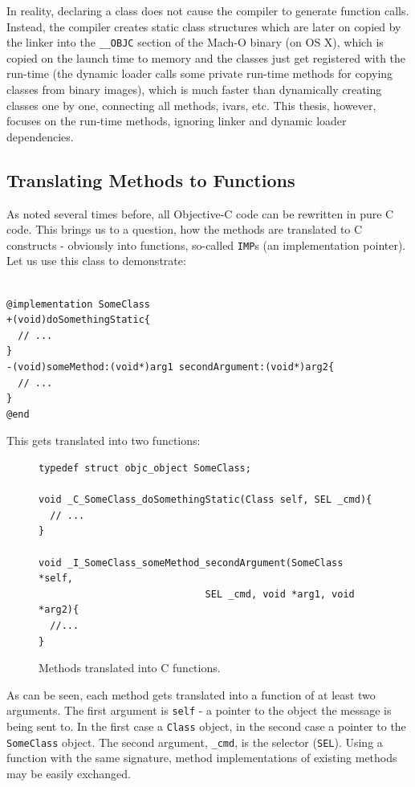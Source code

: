In reality, declaring a class does not cause the compiler to generate function calls. Instead, the compiler creates static class structures which are later on copied by the linker into the \verb=__OBJC= section of the Mach-O binary (on OS X), which is copied on the launch time to memory and the classes just get registered with the run-time (the dynamic loader calls some private run-time methods for copying classes from binary images), which is much faster than dynamically creating classes one by one, connecting all methods, ivars, etc. This thesis, however, focuses on the run-time methods, ignoring linker and dynamic loader dependencies.

\subsection{Translating Methods to Functions}

As noted several times before, all Objective-C code can be rewritten in pure C code. This brings us to a question, how the methods are translated to C constructs - obviously into functions, so-called \verb=IMP=s (an implementation pointer). Let us use this class to demonstrate:

\begin{verbatim}

@implementation SomeClass
+(void)doSomethingStatic{
  // ...
}
-(void)someMethod:(void*)arg1 secondArgument:(void*)arg2{
  // ...
}
@end

\end{verbatim}

This gets translated into two functions:

\begin{figure}[H]
\begin{verbatim}
typedef struct objc_object SomeClass;

void _C_SomeClass_doSomethingStatic(Class self, SEL _cmd){
  // ...
}

void _I_SomeClass_someMethod_secondArgument(SomeClass *self,
                             SEL _cmd, void *arg1, void *arg2){
  //...
}
\end{verbatim}
  \centering{}
  \caption{Methods translated into C functions.}
  \label{fig:methods_translated_into_C_fncts}
\end{figure}

As can be seen, each method gets translated into a function of at least two arguments. The first argument is \verb=self= - a pointer to the object the message is being sent to. In the first case a \verb=Class= object, in the second case a pointer to the \verb=SomeClass= object. The second argument, \verb=_cmd=, is the selector (\verb=SEL=). Using a function with the same signature, method implementations of existing methods may be easily exchanged.

